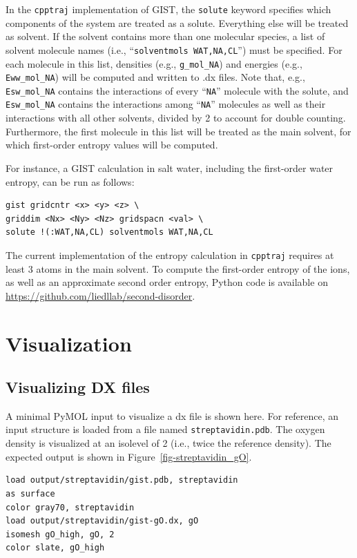 \documentclass[9pt,tutorial]{livecoms}
\newcommand{\software}{\texttt}
\newcommand\inlinecode{\texttt}
\begin{document}
In the \software{cpptraj} implementation of GIST, the \inlinecode{solute} keyword specifies which components of the system are treated as a solute.
Everything else will be treated as solvent.
If the solvent contains more than one molecular species, a list of solvent molecule names (i.e., ``\inlinecode{solventmols WAT,NA,CL}'') must be specified.
For each molecule in this list, densities (e.g., \inlinecode{g\_mol\_NA}) and energies (e.g., \inlinecode{Eww\_mol\_NA}) will be computed and written to .dx files.
Note that, e.g., \inlinecode{Esw\_mol\_NA} contains the interactions of every ``\inlinecode{NA}'' molecule with the solute, and \inlinecode{Esw\_mol\_NA} contains the interactions among ``\inlinecode{NA}'' molecules as well as their interactions with all other solvents, divided by 2 to account for double counting.
Furthermore, the first molecule in this list will be treated as the main solvent, for which first-order entropy values will be computed.

For instance, a GIST calculation in salt water, including the first-order water entropy, can be run as follows:

\begin{lstlisting}[style=cpptraj]
gist gridcntr <x> <y> <z> \
griddim <Nx> <Ny> <Nz> gridspacn <val> \
solute !(:WAT,NA,CL) solventmols WAT,NA,CL
\end{lstlisting}

The current implementation of the entropy calculation in \software{cpptraj} requires at least 3 atoms in the main solvent.
To compute the first-order entropy of the ions, as well as an approximate second order entropy, Python code is available on \url{https://github.com/liedllab/second-disorder}.

\section{Visualization}
\label{sec:visualization}
\subsection{Visualizing DX files}
A minimal PyMOL input to visualize a dx file is shown here.
For reference, an input structure is loaded from a file named \inlinecode{streptavidin.pdb}.
The oxygen density is visualized at an isolevel of 2 (i.e., twice the reference density).
The expected output is shown in Figure~\ref{fig-streptavidin_gO}.

\begin{lstlisting}[style=pymol]
load output/streptavidin/gist.pdb, streptavidin
as surface
color gray70, streptavidin
load output/streptavidin/gist-gO.dx, gO
isomesh gO_high, gO, 2
color slate, gO_high
\end{lstlisting}
\end{document}

